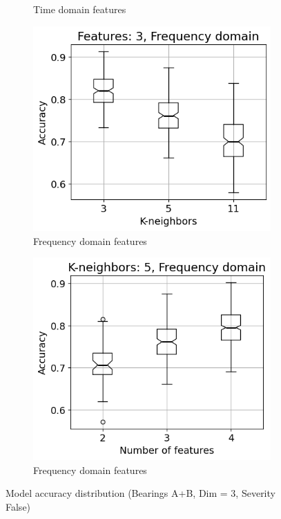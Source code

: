 \begin{figure}[h]
\begin{subfigure}[b]{0.48\textwidth}
        \caption{Time domain features}
    \end{subfigure}
    \hfill
    \begin{subfigure}[b]{0.48\textwidth}
        \includegraphics[width=\textwidth]{assets/results/feature-combinations/FD-3-A-False-False-F3.png}
        \caption{Frequency domain features}
    \end{subfigure}
    \hfill
    \begin{subfigure}[b]{0.48\textwidth}
        \includegraphics[width=\textwidth]{assets/results/feature-combinations/FD-3-A-False-False-K5.png}
        \caption{Frequency domain features}
    \end{subfigure}
    \caption{Model accuracy distribution (Bearings A+B, Dim = 3, Severity False)}
\end{figure}


